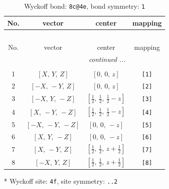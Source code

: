 \documentclass[fleqn,8pt]{jsarticle}
\begin{document}
\renewcommand{\arraystretch}{1.2}
\begin{longtable}{cccc}
\caption{Wyckoff bond: {\tt 8c@4e}, bond symmetry: {\tt 1}}
 \\
 \hline \hline
No. & vector & center & mapping \\ \hline \endfirsthead

\multicolumn{3}{l}{\tablename\ \thetable{}} \\
 \hline \hline
No. & vector & center & mapping \\ \hline \endhead

 \hline \hline
\multicolumn{3}{r}{\footnotesize\it continued ...} \\ \endfoot

 \hline \hline
\multicolumn{3}{r}{} \\ \endlastfoot

1 & $\left[ X,\, Y,\, Z \right]$ & $\left[ 0,\, 0,\, z \right]$ & {\tt [1]} \\ \hline
2 & $\left[ - X,\, - Y,\, Z \right]$ & $\left[ 0,\, 0,\, z \right]$ & {\tt [2]} \\ \hline
3 & $\left[ - X,\, Y,\, - Z \right]$ & $\left[ \frac{1}{2},\, \frac{1}{2},\, \frac{1}{2} - z \right]$ & {\tt [3]} \\ \hline
4 & $\left[ X,\, - Y,\, - Z \right]$ & $\left[ \frac{1}{2},\, \frac{1}{2},\, \frac{1}{2} - z \right]$ & {\tt [4]} \\ \hline
5 & $\left[ - X,\, - Y,\, - Z \right]$ & $\left[ 0,\, 0,\, - z \right]$ & {\tt [5]} \\ \hline
6 & $\left[ X,\, Y,\, - Z \right]$ & $\left[ 0,\, 0,\, - z \right]$ & {\tt [6]} \\ \hline
7 & $\left[ X,\, - Y,\, Z \right]$ & $\left[ \frac{1}{2},\, \frac{1}{2},\, z + \frac{1}{2} \right]$ & {\tt [7]} \\ \hline
8 & $\left[ - X,\, Y,\, Z \right]$ & $\left[ \frac{1}{2},\, \frac{1}{2},\, z + \frac{1}{2} \right]$ & {\tt [8]} \\
\end{longtable}
* Wyckoff site: {\tt 4f}, site symmetry: {\tt ..2}
\renewcommand{\arraystretch}{1.2}
\end{document}
